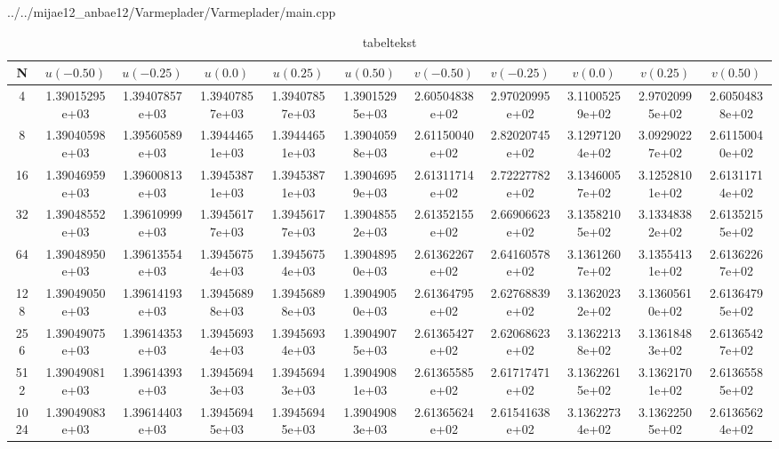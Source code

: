 
{../../mijae12_anbae12/Varmeplader/Varmeplader/main.cpp}


\begin{table}[th!]
\centering
\begin{tabular}{c|c|c|c|c|c|c|c|c|c|c}
 N &  \( u(-0.50) \) & \( u(-0.25) \) & \( u(0.0) \) & \( u(0.25) \) & \( u(0.50) \) & \( v(-0.50) \) & \( v(-0.25) \) & \( v(0.0) \) & \( v(0.25) \) & \( v(0.50) \)  \\\hline
4&1.39015295e+03&1.39407857e+03&1.39407857e+03&1.39407857e+03&1.39015295e+03&2.60504838e+02&2.97020995e+02&3.11005259e+02&2.97020995e+02&2.60504838e+02\\
8&1.39040598e+03&1.39560589e+03&1.39444651e+03&1.39444651e+03&1.39040598e+03&2.61150040e+02&2.82020745e+02&3.12971204e+02&3.09290227e+02&2.61150040e+02
\\
16&1.39046959e+03&1.39600813e+03&1.39453871e+03&1.39453871e+03&1.39046959e+03&2.61311714e+02&2.72227782e+02&3.13460057e+02&3.12528101e+02&2.61311714e+02\\
32&1.39048552e+03&1.39610999e+03&1.39456177e+03&1.39456177e+03&1.39048552e+03&2.61352155e+02&2.66906623e+02&3.13582105e+02&3.13348382e+02&2.61352155e+02\\
64&1.39048950e+03&1.39613554e+03&1.39456754e+03&1.39456754e+03&1.39048950e+03&2.61362267e+02&2.64160578e+02&3.13612607e+02&3.13554131e+02&2.61362267e+02
 \\
128&1.39049050e+03&1.39614193e+03&1.39456898e+03&1.39456898e+03&1.39049050e+03&2.61364795e+02&2.62768839e+02&3.13620232e+02&3.13605610e+02&2.61364795e+02 \\ 
256&1.39049075e+03&1.39614353e+03&1.39456934e+03&1.39456934e+03&1.39049075e+03&2.61365427e+02&2.62068623e+02&3.13622138e+02&3.13618483e+02&2.61365427e+02\\
512&1.39049081e+03&1.39614393e+03&1.39456943e+03&1.39456943e+03&1.39049081e+03&2.61365585e+02&2.61717471e+02&3.13622615e+02&3.13621701e+02&2.61365585e+02 \\
1024&1.39049083e+03&1.39614403e+03&1.39456945e+03&1.39456945e+03&1.39049083e+03&2.61365624e+02&2.61541638e+02&3.13622734e+02&3.13622505e+02&2.61365624e+02 \\
\end{tabular}
\caption[tekst i indholdsfortegnelsen]{tabeltekst}
\label{tb:resultater}
\end{table}



